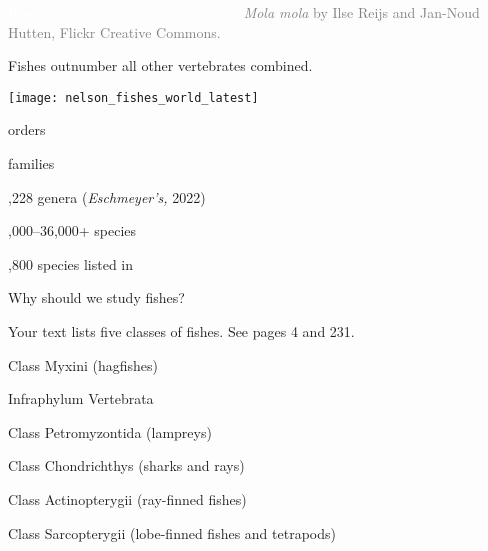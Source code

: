 \documentclass[t]{beamer}
\begin{document}
{
\begin{frame}[b,plain]{\textcolor{white}{How many species of fishes are there?}}
	\hfill\tiny\textcolor{gray}{\textit{Mola mola} by Ilse Reijs and Jan-Noud Hutten, Flickr Creative Commons.}
\end{frame}
}

\begin{frame}[t,plain]{Fishes outnumber all other vertebrates combined.}
\begin{multicols}{2}
	\begin{center}
		\texttt{[image: nelson\_fishes\_world\_latest]} \\
	\end{center}
	
	\columnbreak
	
	 orders

	 families
		
	,228 genera (\textit{Eschmeyer's,} 2022)
		
	,000–36,000+ species
	
	,800 species listed in {\small{}}
		
\end{multicols}
\end{frame}

{
\begin{frame}[t,plain]{Why should we study fishes?}
\end{frame}
}

\begin{frame}[t,plain]{Your text lists five classes of fishes. {\small See pages 4 and 231.}}

	\hspace{5em} Class Myxini (hagfishes)
	
	\hspace{4em} {\small Infraphylum Vertebrata}

	\hspace{5em} Class Petromyzontida (lampreys)

	\hspace{5em} Class Chondrichthys (sharks and rays)

	\hspace{5em} Class Actinopterygii (ray-finned fishes)

	\hspace{5em} Class Sarcopterygii (lobe-finned fishes and tetrapods)
	
	\hangpara{}
	
\end{frame}
\end{document}
